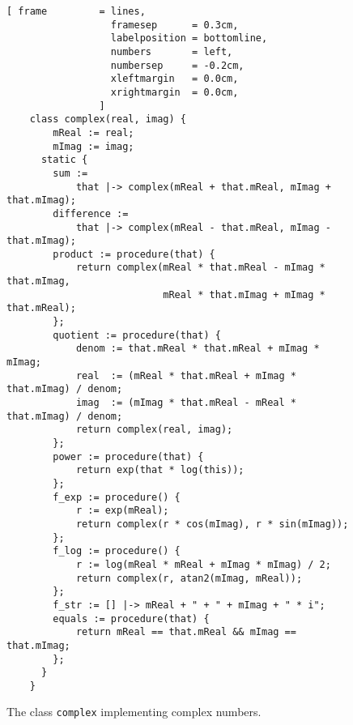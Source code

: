 \begin{figure}[!ht]
\centering
\begin{Verbatim}[ frame         = lines, 
                  framesep      = 0.3cm, 
                  labelposition = bottomline,
                  numbers       = left,
                  numbersep     = -0.2cm,
                  xleftmargin   = 0.0cm,
                  xrightmargin  = 0.0cm,
                ]
    class complex(real, imag) {
        mReal := real;
        mImag := imag;
      static {    
        sum := 
            that |-> complex(mReal + that.mReal, mImag + that.mImag);
        difference := 
            that |-> complex(mReal - that.mReal, mImag - that.mImag);
        product := procedure(that) {
            return complex(mReal * that.mReal - mImag * that.mImag,
                           mReal * that.mImag + mImag * that.mReal);
        };
        quotient := procedure(that) {
            denom := that.mReal * that.mReal + mImag * mImag;
            real  := (mReal * that.mReal + mImag * that.mImag) / denom;
            imag  := (mImag * that.mReal - mReal * that.mImag) / denom;
            return complex(real, imag);
        };
        power := procedure(that) {
            return exp(that * log(this));
        };
        f_exp := procedure() {
            r := exp(mReal);
            return complex(r * cos(mImag), r * sin(mImag));
        };
        f_log := procedure() {
            r := log(mReal * mReal + mImag * mImag) / 2; 
            return complex(r, atan2(mImag, mReal));
        };
        f_str := [] |-> mReal + " + " + mImag + " * i";
        equals := procedure(that) {
            return mReal == that.mReal && mImag == that.mImag;
        };
      }
    }
\end{Verbatim}
\vspace*{-0.3cm}
\caption{The class \texttt{complex} implementing complex numbers.}
\label{fig:complex.stlx}
\end{figure}

